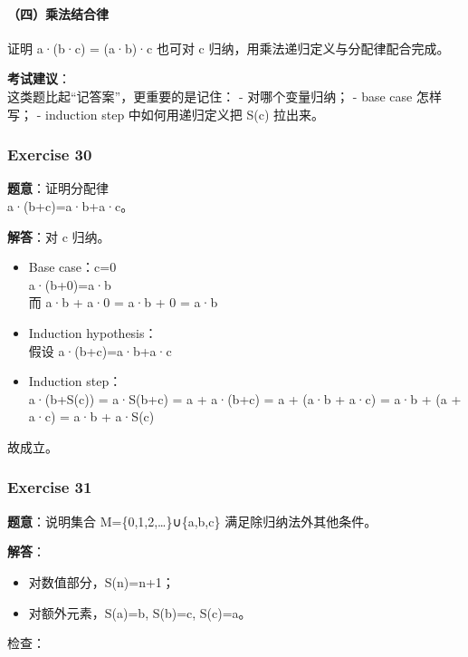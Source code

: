 \documentclass[
  11pt,
]{article}
\providecommand{\tightlist}{%
  \setlength{\itemsep}{0pt}\setlength{\parskip}{0pt}}
\begin{document}
\paragraph{（四）乘法结合律}\label{ux56dbux4e58ux6cd5ux7ed3ux5408ux5f8b}

证明 a·(b·c) = (a·b)·c 也可对 c 归纳，用乘法递归定义与分配律配合完成。

\textbf{考试建议}：\\
这类题比起``记答案''，更重要的是记住： - 对哪个变量归纳； - base case
怎样写； - induction step 中如何用递归定义把 S(c) 拉出来。

\subsubsection{Exercise 30}\label{exercise-30}

\textbf{题意}：证明分配律\\
a·(b+c)=a·b+a·c。

\textbf{解答}：对 c 归纳。

\begin{itemize}
\item
  Base case：c=0\\
  a·(b+0)=a·b\\
  而 a·b + a·0 = a·b + 0 = a·b
\item
  Induction hypothesis：\\
  假设 a·(b+c)=a·b+a·c
\item
  Induction step：\\
  a·(b+S(c)) = a·S(b+c) = a + a·(b+c) = a + (a·b + a·c) = a·b + (a +
  a·c) = a·b + a·S(c)
\end{itemize}

故成立。

\subsubsection{Exercise 31}\label{exercise-31}

\textbf{题意}：说明集合 M=\{0,1,2,\ldots\}∪\{a,b,c\}
满足除归纳法外其他条件。

\textbf{解答}：

\begin{itemize}
\tightlist
\item
  对数值部分，S(n)=n+1；
\item
  对额外元素，S(a)=b, S(b)=c, S(c)=a。
\end{itemize}

检查：
\end{document}
